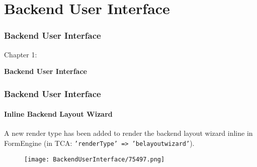 %

\section{Backend User Interface}
\begin{frame}[fragile]
	\frametitle{Backend User Interface}

	\begin{center}\huge{Chapter 1:}\end{center}
	\begin{center}\huge{\color{typo3darkgrey}\textbf{Backend User Interface}}\end{center}

\end{frame}

\begin{frame}[fragile]
	\frametitle{Backend User Interface}
	\framesubtitle{Inline Backend Layout Wizard}

	A new render type has been added to render the backend layout wizard inline in FormEngine
	(in TCA: \texttt{'renderType' => 'belayoutwizard'}).

	\begin{figure}
		\texttt{[image: BackendUserInterface/75497.png]}
	\end{figure}

\end{frame}


